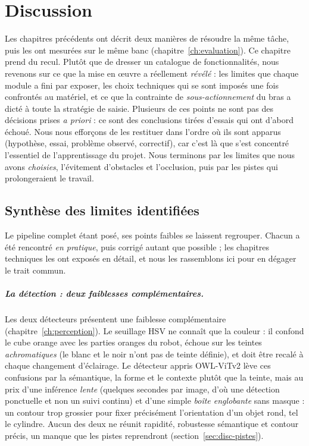 \chapter{Discussion}
\label{ch:discussion}

Les chapitres précédents ont décrit deux manières de résoudre la même tâche, puis les ont mesurées sur le même banc (chapitre~\ref{ch:evaluation}). Ce chapitre prend du recul. Plutôt que de dresser un catalogue de fonctionnalités, nous revenons sur ce que la mise en {\oe}uvre a réellement \emph{révélé} : les limites que chaque module a fini par exposer, les choix techniques qui se sont imposés une fois confrontés au matériel, et ce que la contrainte de \emph{sous-actionnement} du bras a dicté à toute la stratégie de saisie. Plusieurs de ces points ne sont pas des décisions prises \emph{a priori} : ce sont des conclusions tirées d'essais qui ont d'abord échoué. Nous nous efforçons de les restituer dans l'ordre où ils sont apparus (hypothèse, essai, problème observé, correctif), car c'est là que s'est concentré l'essentiel de l'apprentissage du projet. Nous terminons par les limites que nous avons \emph{choisies}, l'évitement d'obstacles et l'occlusion, puis par les pistes qui prolongeraient le travail.

\section{Synthèse des limites identifiées}
\label{sec:disc-limites}

Le pipeline complet étant posé, ses points faibles se laissent regrouper. Chacun a été rencontré \emph{en pratique}, puis corrigé autant que possible ; les chapitres techniques les ont exposés en détail, et nous les rassemblons ici pour en dégager le trait commun.

\paragraph{La détection : deux faiblesses complémentaires.}
Les deux détecteurs présentent une faiblesse complémentaire (chapitre~\ref{ch:perception}). Le seuillage HSV ne connaît que la couleur : il confond le cube orange avec les parties oranges du robot, échoue sur les teintes \emph{achromatiques} (le blanc et le noir n'ont pas de teinte définie), et doit être recalé à chaque changement d'éclairage. Le détecteur appris OWL-ViTv2 lève ces confusions par la sémantique, la forme et le contexte plutôt que la teinte, mais au prix d'une inférence \emph{lente} (quelques secondes par image, d'où une détection ponctuelle et non un suivi continu) et d'une simple \emph{boîte englobante} sans masque : un contour trop grossier pour fixer précisément l'orientation d'un objet rond, tel le cylindre. Aucun des deux ne réunit rapidité, robustesse sémantique et contour précis, un manque que les pistes reprendront (section~\ref{sec:disc-pistes}).

